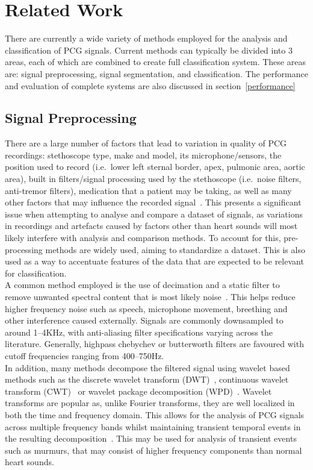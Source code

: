 \documentclass[titlepage, 12pt]{scrartcl} \usepackage{enumitem}
\begin{document}
\section{Related Work}
There are currently a wide variety of methods employed for the analysis and
classification of PCG signals. Current methods can typically be divided into 3
areas, each of which are combined to create full classification system. These
areas are: signal preprocessing, signal segmentation, and classification.  The
performance and evaluation of complete systems are also discussed in
section~\ref{performance}


\subsection{Signal Preprocessing}
There are a large number of factors that lead to variation in quality of PCG
recordings: stethoscope type, make and model, its microphone/sensors, the
position used to record (i.e.\ lower left sternal border, apex, pulmonic area,
aortic area), built in filters/signal processing used by the stethoscope (i.e.\
noise filters, anti-tremor filters), medication that a patient may be taking,
as well as many other factors that may influence the recorded
signal~\parencite[p.4]{Pavlopoulos2004}. This presents a significant issue when
attempting to analyse and compare a dataset of signals, as variations in
recordings and artefacts caused by factors other than heart sounds will most
likely interfere with analysis and comparison methods. To account for this,
pre-processing methods are widely used, aiming to standardize a dataset. This
is also used as a way to accentuate features of the data that are expected to
be relevant for classification.\\

A common method employed is the use of decimation and a static filter to remove
unwanted spectral content that is most likely noise~\parencite{Liang1997a,
Homsi2016, Springer2016, Gupta2007}. This helps reduce higher frequency noise
such as speech, microphone movement, breething and other interference caused
externally. Signals are commonly downsampled to around 1--4KHz, with
anti-aliasing filter specifications varying across the literature. Generally,
highpass chebychev or butterworth filters are favoured with cutoff frequencies
ranging from 400--750Hz.\\

In addition, many methods decompose the filtered signal using wavelet based
methods such as the discrete wavelet transform
(DWT)~\parencite{Liang1997a, Pavlopoulos2004}, continuous
wavelet transform (CWT)~\parencite{Langley2016} or wavelet
package decomposition (WPD)~\parencite{Liang1998}.
Wavelet transforms are popular as, unlike Fourier transforms, they are well
localized in both the time and frequency domain. This allows for the analysis
of PCG signals across multiple frequency bands whilst maintaining transient
temporal events in the resulting decomposition~\parencite[p.93]{Ari2008}.
This may be used for analysis of transient events such as murmurs, that may
consist of higher frequency components than normal heart sounds.
\end{document}
